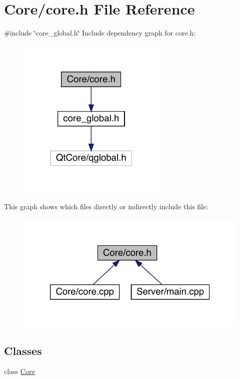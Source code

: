 \hypertarget{a00014}{}\section{Core/core.h File Reference}
\label{a00014}
{\ttfamily \#include \char`\"{}core\+\_\+global.\+h\char`\"{}}\newline
Include dependency graph for core.\+h\+:
\nopagebreak
\begin{figure}[H]
\begin{center}
\leavevmode
\includegraphics[width=202pt]{dd/d1b/a00015}
\end{center}
\end{figure}
This graph shows which files directly or indirectly include this file\+:
\nopagebreak
\begin{figure}[H]
\begin{center}
\leavevmode
\includegraphics[width=320pt]{d7/d7a/a00016}
\end{center}
\end{figure}
\subsection*{Classes}
\begin{DoxyCompactItemize}
\item 
class \hyperlink{a00145}{Core}
\end{DoxyCompactItemize}

